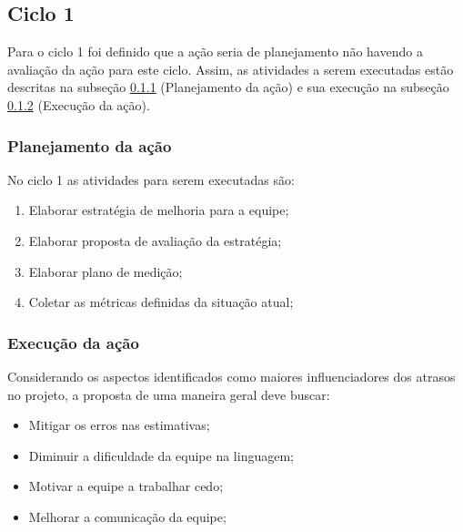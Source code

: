 \subsection{Ciclo 1}

	Para o ciclo 1 foi definido que a ação seria de planejamento não havendo a avaliação da ação para este ciclo. Assim, as atividades a serem
	executadas estão descritas na subseção \ref{sub:planejamento} (Planejamento da ação) e sua execução na subseção \ref{sub:execucao} (Execução da ação).

	\subsubsection{Planejamento da ação}
		\label{sub:planejamento}

		No ciclo 1 as atividades para serem executadas são:

		\begin{enumerate}

			\item Elaborar estratégia de melhoria para a equipe;

			\item Elaborar proposta de avaliação da estratégia;

			\item Elaborar plano de medição;

			\item Coletar as métricas definidas da situação atual;


		\end{enumerate}


	\subsubsection{Execução da ação}
		\label{sub:execucao}


			Considerando os aspectos identificados como maiores influenciadores dos atrasos no projeto, a proposta de uma maneira geral deve buscar:

			\begin{itemize}

				\item Mitigar os erros nas estimativas;
				\item Diminuir a dificuldade da equipe na linguagem;
				\item Motivar a equipe a trabalhar cedo;
				\item Melhorar a comunicação da equipe;
			
			\end{itemize}

